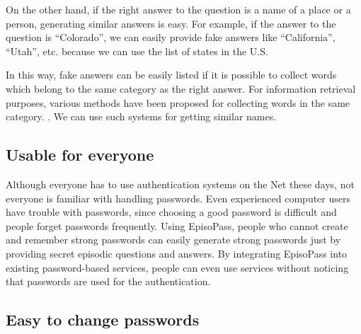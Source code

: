 \documentclass{article}
\begin{document}


On the other hand, if the right answer to the question is a name of a place or a person,
generating similar answers is easy.
For example, if the answer to the question is ``Colorado'',
we can easily provide fake answers like ``California'', ``Utah'', etc.
because we can use the list of states in the U.S.

In this way, fake answers can be easily listed
if it is possible to collect words which belong to the same
category as the right answer.
%
For information retrieval purposes,
various methods have been proposed for collecting words in the
same category.
\cite{Huang:2012:LFC:2426725.2426728}%
\cite{BooWa}%
\cite{Wang:2007:LSE:1441428.1442086}%
\cite{大島裕明:2006-12-15}.%
We can use such systems for getting similar names.

\subsection{Usable for everyone}

Although everyone has to use authentication systems on the Net these days,
not everyone is familiar with handling passwords.
Even experienced computer users have trouble with passwords,
since choosing a good password is difficult and people forget passwords frequently.
Using EpisoPass, people who cannot create and remember strong passwords
can easily generate strong passwords just by providing secret episodic
questions and answers.
By integrating EpisoPass into existing password-based services,
people can even use services without noticing that passwords are
used for the authentication.

\subsection{Easy to change passwords}
\end{document}
